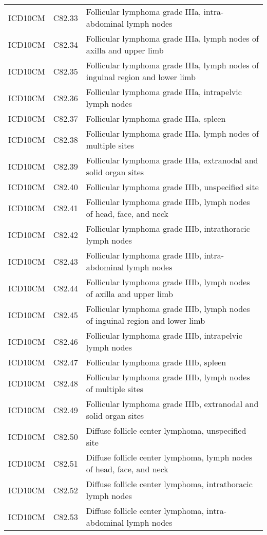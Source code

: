 \begin{longtable}{p{}p{}p{}}
  ICD10CM & C82.33 & Follicular lymphoma grade IIIa, intra-abdominal lymph nodes \\ 
  ICD10CM & C82.34 & Follicular lymphoma grade IIIa, lymph nodes of axilla and upper limb \\ 
  ICD10CM & C82.35 & Follicular lymphoma grade IIIa, lymph nodes of inguinal region and lower limb \\ 
  ICD10CM & C82.36 & Follicular lymphoma grade IIIa, intrapelvic lymph nodes \\ 
  ICD10CM & C82.37 & Follicular lymphoma grade IIIa, spleen \\ 
  ICD10CM & C82.38 & Follicular lymphoma grade IIIa, lymph nodes of multiple sites \\ 
  ICD10CM & C82.39 & Follicular lymphoma grade IIIa, extranodal and solid organ sites \\ 
  ICD10CM & C82.40 & Follicular lymphoma grade IIIb, unspecified site \\ 
  ICD10CM & C82.41 & Follicular lymphoma grade IIIb, lymph nodes of head, face, and neck \\ 
  ICD10CM & C82.42 & Follicular lymphoma grade IIIb, intrathoracic lymph nodes \\ 
  ICD10CM & C82.43 & Follicular lymphoma grade IIIb, intra-abdominal lymph nodes \\ 
  ICD10CM & C82.44 & Follicular lymphoma grade IIIb, lymph nodes of axilla and upper limb \\ 
  ICD10CM & C82.45 & Follicular lymphoma grade IIIb, lymph nodes of inguinal region and lower limb \\ 
  ICD10CM & C82.46 & Follicular lymphoma grade IIIb, intrapelvic lymph nodes \\ 
  ICD10CM & C82.47 & Follicular lymphoma grade IIIb, spleen \\ 
  ICD10CM & C82.48 & Follicular lymphoma grade IIIb, lymph nodes of multiple sites \\ 
  ICD10CM & C82.49 & Follicular lymphoma grade IIIb, extranodal and solid organ sites \\ 
  ICD10CM & C82.50 & Diffuse follicle center lymphoma, unspecified site \\ 
  ICD10CM & C82.51 & Diffuse follicle center lymphoma, lymph nodes of head, face, and neck \\ 
  ICD10CM & C82.52 & Diffuse follicle center lymphoma, intrathoracic lymph nodes \\ 
  ICD10CM & C82.53 & Diffuse follicle center lymphoma, intra-abdominal lymph nodes \\ 

\end{longtable}
